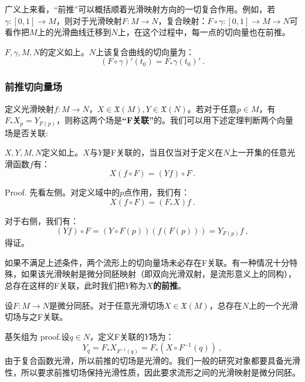 广义上来看，“前推”可以概括顺着光滑映射方向的一切复合作用。例如，若$\gamma:[0,1]\rightarrow M$，则对于光滑映射$F:M\rightarrow N$，复合映射：$F\circ \gamma:[0,1]\rightarrow M\rightarrow N$可看作把$M$上的光滑曲线迁移到$N$上，在这个过程中，每一点的切向量也在前推。
\begin{lemma}{}
$F,\gamma,M,N$的定义如上。$N$上该复合曲线的切向量为：
\begin{equation}
(F\circ\gamma)'(t_0)=F_*\gamma(t_0)'~.
\end{equation}
\end{lemma}
\subsubsection{前推切向量场}
定义光滑映射$f:M\rightarrow N$，$X \in \mathfrak{X
}(M),Y\in \mathfrak{X}(N)$。若对于任意$p\in M$，有$F_*X_p=Y_{F(p)}$，则称这两个场是\textbf{“F关联”}的。我们可以用下述定理判断两个向量场是否关联:
\begin{theorem}{}
$X,Y,M,N$定义如上。$X$与$Y$是F关联的，当且仅当对于定义在$N$上一开集的任意光滑函数$f$有：
\begin{equation}
X(f\circ F)=(Yf)\circ F~.
\end{equation}
\end{theorem}
Proof.
先看左侧。对定义域中的$p$点作用，我们有：
\begin{equation}
X(f\circ F)=(F_*X)f~.
\end{equation}

对于右侧，我们有：
\begin{equation}
(Yf)\circ F=(Y\circ F(p))(f (F(p)))=Y_{F(p)}f~,
\end{equation}
得证。

如果不满足上述条件，两个流形上的切向量场未必存在F关联。有一种情况十分特殊，如果该光滑映射是微分同胚映射（即双向光滑双射，是流形意义上的同构），总存在这样的F关联，此时我们把$Y$称为\textbf{$X$的前推}。
\begin{theorem}{}
设$F:M\rightarrow N$是微分同胚。对于任意光滑切场$X\in \mathfrak{X}(M)$，总存在$N$上的一个光滑切场与之F关联。
\end{theorem}
基矢组为
proof.设$q\in N$，定义F关联的$Y$场为：
\begin{equation}
Y_q=F_*X_{F^{-1}(q)}=F_*(X\circ F^{-1}(q))~,
\end{equation}
由于复合函数光滑，所以前推的切场是光滑的。我们一般的研究对象都要具备光滑性，所以要求前推切场保持光滑性质，因此要求流形之间的光滑映射是微分同胚。
